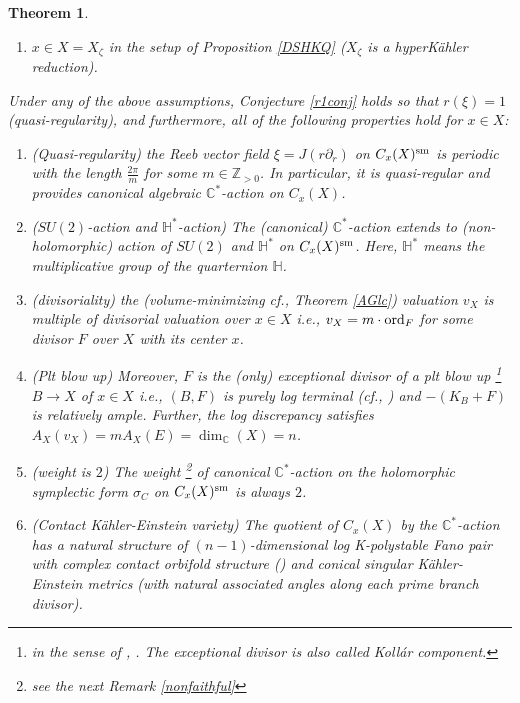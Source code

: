 \documentclass[12pt,a4paper]{amsart}
\newtheorem{Thm}{Theorem}[section]
\theoremstyle{remark}
\theoremstyle{definition}
\def\dim{\operatorname{dim}}
\def\C{\mathbb{C}}
\def\Z{\mathbb{Z}}
\begin{document}
\begin{Thm}
\begin{enumerate}
\item \label{r1prop:HKQcase}
$x\in X=X_\zeta$ in the setup of Proposition \ref{DSHKQ} 
($X_\zeta$ is a hyperK\"ahler reduction). 
\end{enumerate}
Under any of the above assumptions, 
Conjecture \ref{r1conj} holds so that 
$r(\xi)=1$ (quasi-regularity), and 
furthermore, all of 
the following properties hold for $x\in 
X$: 
\begin{enumerate}[label=(\alph*)]
   \item (Quasi-regularity) \label{r1propcons.a} the Reeb vector field $\xi=J(r\partial_r)$ 
   on $C_x(X)^{\rm sm}$ is periodic with 
   the length $\frac{2\pi}{m}$ for some $m\in \Z_{>0}$. In 
   particular, it is quasi-regular and provides canonical algebraic $\C^*$-action on $C_x(X)$. 
   \item ($SU(2)$-action and $\mathbb{H}^*$-action) \label{r1propcons.b} The (canonical) 
   $\C^*$-action extends to (non-holomorphic) action of $SU(2)$ and $\mathbb{H}^*$ on 
   $C_x(X)^{\rm sm}$. Here, $\mathbb{H}^*$ means the multiplicative 
   group of the quarternion $\mathbb{H}$. 
    \item (divisoriality) \label{r1propcons.c}
    the (volume-minimizing cf., 
Theorem \ref{AGlc}) valuation $v_X$ is multiple of divisorial valuation 
over $x\in X$ i.e., $v_X=m\cdot {\rm ord}_F$ for some divisor $F$ over $X$ 
with its center $x$. 
\item (Plt blow up) \label{r1propcons.d}
Moreover, $F$ is the (only) exceptional divisor of a plt blow up
\footnote{in the sense of 
\cite[3.1]{Shokurov}, 
\cite[Definition 2.1]{Prokhorov}. The exceptional divisor is 
also called Koll\'ar component.}
$B\to X$ 
of $x\in X$ i.e., 
$(B,F)$ is purely log terminal 
(cf., \cite[\S 2.3]{KM}) 
and 
$-(K_B+F)$ is relatively ample. 
Further, the log 
discrepancy satisfies 
$A_X(v_X)=m A_X(E)=\dim_\C(X)=n$. 
\item (weight is $2$) \label{r1propcons.e}
The weight 
\footnote{see the next Remark \ref{nonfaithful}} 
of canonical $\C^*$-action 
on the holomorphic symplectic form 
$\sigma_C$ on $C_x(X)^{\rm sm}$ is always 
$2$. 
\item (Contact K\"ahler-Einstein variety) \label{r1propcons.f} 
The quotient of $C_x(X)$ by the $\C^*$-action has a natural structure of 
$(n-1)$-dimensional 
log K-polystable Fano pair with complex contact orbifold structure 
(\cite{Name}) 
and conical singular 
K\"ahler-Einstein metrics (with natural associated angles along each 
prime branch divisor). 
\end{enumerate}
\end{Thm}
\end{document}
